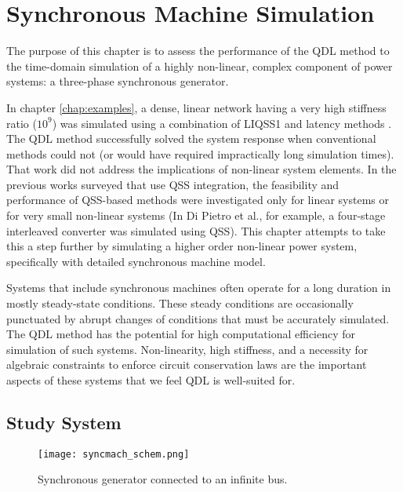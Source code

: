 
\chapter{Synchronous Machine Simulation}\label{chap:syncmach}

The purpose of this chapter is to assess the performance of the QDL method to the time-domain simulation of a highly non-linear, complex component of power systems: a three-phase synchronous generator.

In chapter \ref{chap:examples}, a dense, linear network having a very high stiffness ratio ($10^9$) was simulated using a combination of LIQSS1 and latency methods \cite{schutt2001}. The QDL method successfully solved the system response when conventional methods could not (or would have required impractically long simulation times). That work did not address the implications of non-linear system elements. In the previous works surveyed that use QSS integration, the feasibility and performance of QSS-based methods were investigated only for linear systems or for very small non-linear systems (In Di Pietro et al., \cite{pietro2018} for example, a four-stage interleaved converter was simulated using QSS). This chapter attempts to take this a step further by simulating a higher order non-linear power system, specifically with detailed synchronous machine model. 

Systems that include synchronous machines often operate for a long duration in mostly steady-state conditions. These steady conditions are occasionally punctuated by abrupt changes of conditions that must be accurately simulated. The QDL method has the potential for high computational efficiency for simulation of such systems. Non-linearity, high stiffness, and a necessity for algebraic constraints to enforce circuit conservation laws are the important aspects of these systems that we feel QDL is well-suited for.

\section{Study System}

\begin{figure}[h]
    \centering
    \texttt{[image: syncmach\_schem.png]}
    \caption{Synchronous generator connected to an infinite bus.}
    \label{fig:syncmach_schem}
\end{figure}

